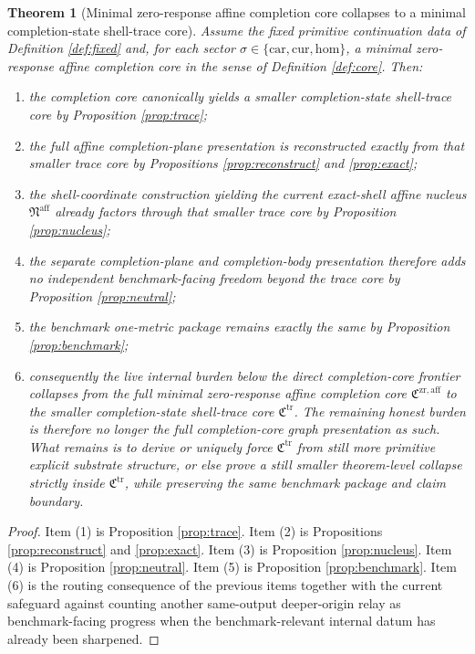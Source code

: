 \documentclass[11pt]{article}
\newcommand{\CompletionCore}{\mathfrak C^{\mathrm{zr,aff}}}
\newcommand{\TraceCore}{\mathfrak C^{\mathrm{tr}}}
\newcommand{\AffineNucleus}{\mathfrak N^{\mathrm{aff}}}
\newcommand{\Car}{\mathrm{car}}
\newcommand{\Cur}{\mathrm{cur}}
\newcommand{\Hom}{\mathrm{hom}}
\newtheorem{theorem}{Theorem}
\begin{document}
\begin{theorem}[Minimal zero-response affine completion core collapses to a minimal completion-state shell-trace core]
\label{thm:main}
Assume the fixed primitive continuation data of Definition \ref{def:fixed} and, for each sector \(\sigma\in\{\Car,\Cur,\Hom\}\), a minimal zero-response affine completion core in the sense of Definition \ref{def:core}. Then:
\begin{enumerate}
    \item the completion core canonically yields a smaller completion-state shell-trace core by Proposition \ref{prop:trace};
    \item the full affine completion-plane presentation is reconstructed exactly from that smaller trace core by Propositions \ref{prop:reconstruct} and \ref{prop:exact};
    \item the shell-coordinate construction yielding the current exact-shell affine nucleus \(\AffineNucleus\) already factors through that smaller trace core by Proposition \ref{prop:nucleus};
    \item the separate completion-plane and completion-body presentation therefore adds no independent benchmark-facing freedom beyond the trace core by Proposition \ref{prop:neutral};
    \item the benchmark one-metric package remains exactly the same by Proposition \ref{prop:benchmark};
    \item consequently the live internal burden below the direct completion-core frontier collapses from the full minimal zero-response affine completion core \(\CompletionCore\) to the smaller completion-state shell-trace core \(\TraceCore\). The remaining honest burden is therefore no longer the full completion-core graph presentation as such. What remains is to derive or uniquely force \(\TraceCore\) from still more primitive explicit substrate structure, or else prove a still smaller theorem-level collapse strictly inside \(\TraceCore\), while preserving the same benchmark package and claim boundary.
\end{enumerate}
\end{theorem}

\begin{proof}
Item (1) is Proposition \ref{prop:trace}. Item (2) is Propositions \ref{prop:reconstruct} and \ref{prop:exact}. Item (3) is Proposition \ref{prop:nucleus}. Item (4) is Proposition \ref{prop:neutral}. Item (5) is Proposition \ref{prop:benchmark}. Item (6) is the routing consequence of the previous items together with the current safeguard against counting another same-output deeper-origin relay as benchmark-facing progress when the benchmark-relevant internal datum has already been sharpened.
\end{proof}
\end{document}
